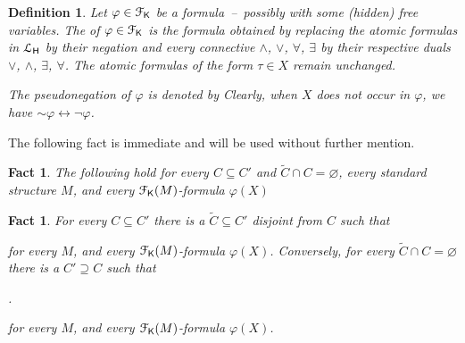 \documentclass{amsproc}
\newcounter{thm}
\theoremstyle{mio}
\newtheorem{fact}[thm]{Fact}\tcolorboxenvironment{fact}{mythm}
\newtheorem{definition}[thm]{Definition}\tcolorboxenvironment{definition}{mythm}
\renewcommand*{\emph}[1]{%
   \smash{\tikz[baseline]\node[rectangle, fill=teal!25, rounded corners, inner xsep=0.5ex, inner ysep=0.2ex, anchor=base, minimum height = 2.7ex]{\strut #1};}}
\begin{document}
\begin{definition}
   Let $\varphi\in{\EuScript F}_{\sf K}$ be a formula~--~possibly with some (hidden) free variables.
   The \emph{pseudonegation\/} of $\varphi\in{\EuScript F}_{\sf K}$ is the formula obtained by replacing the atomic formulas in  ${\EuScript L}_{\sf H}$ by their negation and every connective $\wedge$, $\vee$, $\forall$, $\exists$
   by their respective duals $\vee$, $\wedge$, $\exists$, $\forall$.
   The atomic formulas of the form $\tau\in X$ remain unchanged.\smallskip
   
  The pseudonegation of $\varphi$ is denoted by \emph{${\sim}\varphi$.}
  Clearly, when $X$ does not occur in $\varphi$, we have ${\sim}\varphi\leftrightarrow\neg\varphi$.
\end{definition}


The following fact is immediate and will be used without further mention.

\begin{fact}\label{fact_trivial}
  The following hold for every $C\subseteq C'$ and $\tilde C\cap C=\varnothing$, every standard structure $M$, and every ${\EuScript F}_{\sf K}(M)$-formula $\varphi(X)$

  \smallskip

  \smallskip
  
\end{fact}

\begin{fact}
  For every $C\subseteq C'$ there is a $\tilde C\subseteq C'$ disjoint from $C$ such that\smallskip
  
  \smallskip

  for every $M$, and every ${\EuScript F}_{\sf K}(M)$-formula $\varphi(X)$.
  Conversely, for every $\tilde C\cap C=\varnothing$ there is a $C'\supseteq C$ such that

  .\smallskip

  for every $M$, and every ${\EuScript F}_{\sf K}(M)$-formula $\varphi(X)$.
\end{fact}
\end{document}
